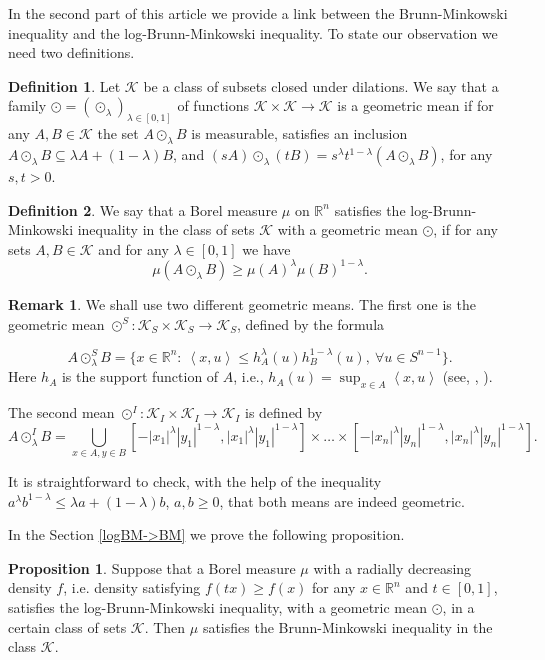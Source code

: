 \documentclass[11pt]{article}
\newcommand{\mb}[1]{\mathbb{{#1}}}
\newcommand{\mc}[1]{\mathcal{{#1}}}
\newcommand{\1}{\mathbf{{1}}}
\newcommand{\scal}[2]{\left\langle #1, #2 \right\rangle}
\theoremstyle{definition}
\newtheorem{prop}{Proposition}
\newtheorem{rem}{Remark}
\newtheorem{defi}{Definition}
\begin{document}
In the second part of this article we provide a link between the Brunn-Minkowski inequality and the log-Brunn-Minkowski inequality.  To state our observation we need two definitions.


\begin{defi}
Let $\mc{K}$ be a class of subsets closed under dilations. We say that a family $\odot=(\odot_\lambda)_{\lambda \in [0,1]}$ of functions $\mc{K} \times \mc{K} \to \mc{K}$ is a geometric mean if for any $A,B \in \mc{K}$ the set $A \odot_\lambda B$ is measurable, satisfies an inclusion $A \odot_\lambda B \subseteq \lambda A + (1-\lambda)B$, and   $(sA)\odot_\lambda(tB)=s^\lambda t^{1-\lambda} (A \odot_\lambda B)$, for any $s,t > 0$.
\end{defi}


\begin{defi}
We say that a Borel measure $\mu$ on $\mb{R}^n$ satisfies the log-Brunn-Minkowski inequality in the class of sets $\mc{K}$ with a geometric mean $\odot$, if for any  sets $A,B \in \mc{K}$ and for any $\lambda \in [0,1]$ we have
\[
	\mu( A \odot_\lambda B  ) \geq  \mu(A)^{\lambda}   \mu(B)^{1-\lambda}.
\]
\end{defi}

\begin{rem}\label{r1}
We shall use two different geometric means. The first one is the geometric mean $\odot^S: \mc{K}_S \times \mc{K}_S \to \mc{K}_S$, defined by the formula

\[
	A \odot_\lambda^{S} B   = \{x \in \mb{R}^n: \ \scal{x}{u} \leq h_A^{\lambda}(u) h_{B}^{1-\lambda}(u), \ \forall u \in S^{n-1} \}.
\]
Here $h_A$ is the support function of $A$, i.e., $h_A(u)=\sup_{x \in A} \scal{x}{u}$ (see, \cite{G2}, \cite{Sn}).

The second mean $\odot^I: \mc{K}_I \times \mc{K}_I \to \mc{K}_I$ is defined by
\[
	A \odot_\lambda^I B = \bigcup_{x \in A, y \in B} [-|x_1|^\lambda |y_1|^{1-\lambda}, |x_1|^\lambda |y_1|^{1-\lambda}] \times \ldots \times [-|x_n|^\lambda |y_n|^{1-\lambda}, |x_n|^\lambda |y_n|^{1-\lambda}].
\]

It is straightforward to check, with the help of the inequality $a^\lambda b^{1-\lambda} \leq \lambda a +(1-\lambda)b$, $a,b \geq 0$, that both means are indeed geometric.
\end{rem}

\noindent In the Section \ref{logBM->BM} we prove the following proposition.

\begin{prop}\label{prop}
Suppose that a Borel measure $\mu$ with a radially decreasing density $f$, i.e. density satisfying $f(tx) \geq f(x)$ for any $x \in \mb{R}^n$ and $t \in [0,1]$, satisfies the log-Brunn-Minkowski inequality, with a geometric mean $\odot$, in a certain class of sets $\mc{K}$. Then $\mu$ satisfies the Brunn-Minkowski inequality in the class $\mc{K}$.
\end{prop}
\end{document}
